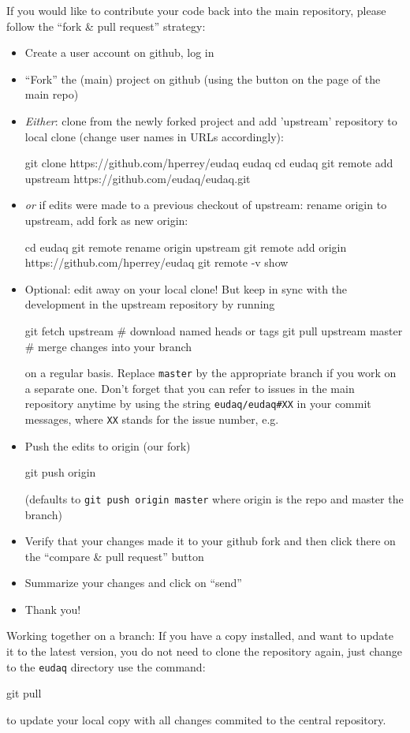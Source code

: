 If you would like to contribute your code back into the main repository, please follow the ``fork \& pull request'' strategy:

\begin{itemize}
\item Create a user account on github, log in
\item ``Fork'' the (main) project on github (using the button on the page of the main repo)
\item \emph{Either}: clone from the newly forked project and add
  'upstream' repository to local clone (change user names in URLs
  accordingly):
  \begin{listing}[mybash]
git clone https://github.com/hperrey/eudaq eudaq
cd eudaq
git remote add upstream https://github.com/eudaq/eudaq.git
\end{listing}
\item \emph{or} if edits were made to a previous checkout of upstream: rename origin to upstream, add fork as new origin:

  \begin{listing}[mybash]
cd eudaq
git remote rename origin upstream
git remote add origin https://github.com/hperrey/eudaq
git remote -v show
\end{listing}
\item Optional: edit away on your local clone! But keep in sync with
  the development in the upstream repository by running
  \begin{listing}
git fetch upstream        # download named heads or tags
git pull upstream master  # merge changes into your branch
\end{listing}
on a regular basis. Replace \texttt{master} by the appropriate branch if you work on a separate one.
Don't forget that you can refer to issues in the main repository anytime by using the string \texttt{eudaq/eudaq\#XX} in your commit messages, where \texttt{XX} stands for the issue number, e.g.
\item Push the edits to origin (our fork)
  \begin{listing}[mybash]
git push origin
\end{listing}
(defaults to \texttt{git push origin master} where origin is the repo and master the branch)
\item Verify that your changes made it to your github fork and then click there on the ``compare \& pull request'' button
\item Summarize your changes and click on ``send''
\item Thank you!
\end{itemize}


Working together on a branch:
If you have a copy installed, and want to update it to the
latest version, you do not need to clone the repository again, just change to the \texttt{eudaq} directory use the command:
\begin{listing}[mybash]
git pull
\end{listing}
to update your local copy with all changes commited to the central repository.%

